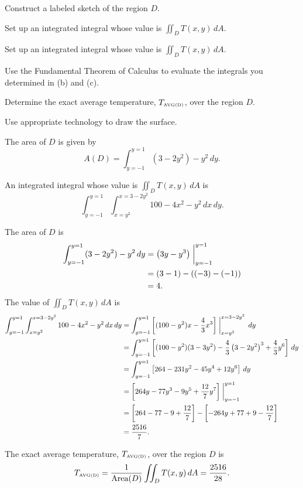\begin{exercises}
\ba
	\item Construct a labeled sketch of the region $D$.
	\item Set up an integrated integral whose value is $\iint_D T(x,y) \, dA$. 
	\item Set up an integrated integral whose value is $\iint_D T(x,y) \, dA$.
	\item Use the Fundamental Theorem of Calculus to evaluate the integrals you determined in (b) and (c).
	\item Determine the exact average temperature, $T_{\mbox{\tiny{AVG}(D)}}$, over the region $D$.
\ea

\begin{exerciseSolution}
\ba
	\item Use appropriate technology to draw the surface. 
	\item The area of $D$ is given by 
\[A(D) = \int_{y=-1}^{y=1}  (3-2y^2) - y^2 \, dy.\]

	\item An integrated integral whose value is $\iint_D T(x,y) \, dA$ is
\[\int_{y=-1}^{y=1} \int_{x=y^2}^{x=3-2y^2} 100-4x^2 - y^2 \, dx \, dy.\]
 
	\item The area of $D$ is 
\begin{align*}
\int_{y=-1}^{y=1}  (3-2y^2) - y^2 \, dy &= \left(3y-y^3 \right)\biggm|_{y=-1}^{y=1} \\
	&= (3-1)-((-3)-(-1)) \\
	&= 4.
\end{align*}
The value of $\iint_D T(x,y) \, dA$ is
\begin{align*}
\int_{y=-1}^{y=1} \int_{x=y^2}^{x=3-2y^2} 100-4x^2 - y^2 \, dx \, dy &= \int_{y=-1}^{y=1} \left[(100-y^2)x - \frac{4}{3}x^3\right] \biggm|_{x=y^2}^{x=3-2y^2}  \, dy \\
	&= \int_{y=-1}^{y=1} \left[(100-y^2)(3-3y^2) - \frac{4}{3}\left(3-2y^2\right)^3 + \frac{4}{3}y^6\right]  \, dy \\
	&= \int_{y=-1}^{y=1} \left[264-231y^2-45y^4+12y^6\right]  \, dy \\
	&= \left[264y-77y^3-9y^5+\frac{12}{7}y^7\right] \biggm|_{y=-1}^{y=1}  \\
	&= \left[264-77-9+\frac{12}{7}\right] - \left[-264y+77+9-\frac{12}{7}\right]   \\
	&= \frac{2516}{7}.
\end{align*}

	\item The exact average temperature, $T_{\mbox{\tiny{AVG}(D)}}$, over the region $D$ is
\[T_{\mbox{\tiny{AVG}(D)}} = \frac{1}{\text{Area}(D)} \iint_D T(x,y) \, dA = \frac{2516}{28}.\]


\end{exerciseSolution}
\end{exercises}
